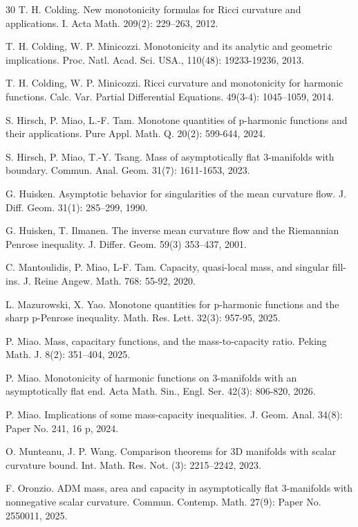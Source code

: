 \documentclass[12pt]{article}
\theoremstyle{definition}
\theoremstyle{plain}
\numberwithin{equation}{section}
\begin{document}
\begin{thebibliography}{30}
 T. H. Colding. New monotonicity formulas for Ricci curvature and applications. I. Acta Math. 209(2): 229–263, 2012.

T. H. Colding, W. P. Minicozzi. Monotonicity and its analytic and geometric implications. Proc. Natl. Acad. Sci. USA., 110(48): 19233-19236, 2013.

 T. H. Colding, W. P. Minicozzi. Ricci curvature and monotonicity for harmonic functions. Calc. Var. Partial Differential Equations. 49(3-4): 1045–1059, 2014.

 S. Hirsch, P. Miao, L.-F. Tam. Monotone quantities of p-harmonic functions and their applications. Pure Appl. Math. Q. 20(2): 599-644, 2024.

 S. Hirsch, P. Miao, T.-Y. Tsang. Mass of asymptotically flat 3-manifolds with boundary. Commun. Anal. Geom. 31(7): 1611-1653, 2023.

 G. Huisken. Asymptotic behavior for singularities of the mean curvature flow. J. Diff. Geom. 31(1): 285–299, 1990.

 G. Huisken, T. Ilmanen. The inverse mean curvature flow and the Riemannian Penrose inequality. J. Differ. Geom. 59(3) 353–437, 2001.

 C. Mantoulidis, P. Miao, L-F. Tam. Capacity, quasi-local mass, and singular fill-ins. J. Reine Angew. Math. 768: 55-92, 2020.

 L. Mazurowski, X. Yao. Monotone quantities for p-harmonic functions and the sharp p-Penrose inequality. Math. Res. Lett. 32(3): 957-95, 2025.

 P. Miao. Mass, capacitary functions, and the mass-to-capacity ratio. Peking Math. J. 8(2): 351–404, 2025.

 P. Miao. Monotonicity of harmonic functions on 3-manifolds with an asymptotically flat end. Acta Math. Sin., Engl. Ser. 42(3): 806-820, 2026.

 P. Miao. Implications of some mass-capacity inequalities. J. Geom. Anal. 34(8): Paper No. 241, 16 p, 2024. 

 O. Munteanu, J. P. Wang. Comparison theorems for 3D manifolds with scalar curvature bound. Int. Math. Res. Not. (3): 2215–2242, 2023.

 F. Oronzio. ADM mass, area and capacity in asymptotically flat 3-manifolds with nonnegative scalar curvature. Commun. Contemp. Math. 27(9): Paper No. 2550011, 2025. 


\end{thebibliography}
\end{document}
